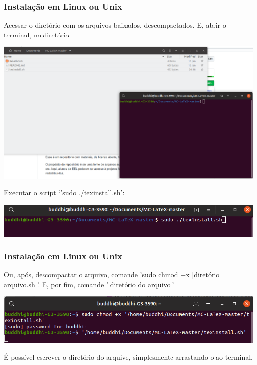 \documentclass{beamer}
\begin{document}
\begin{frame}
  \frametitle{Instalação em Linux ou Unix}

  \begin{tcolorbox}[width=12cm, height=10.1mm, top=0.1mm]
    Acessar o diretório com os arquivos baixados, descompactados. E,
    abrir o terminal, no diretório.
  \end{tcolorbox}

  \begin{center}
    \includegraphics[scale=0.15]{../Imagens/MC4.png}
  \end{center}

  \pause

  \begin{tcolorbox}[sharp corners, width=12cm, height=6.7mm, top=0.2mm]
    Executar o script `'sudo ./texinstall.sh':
  \end{tcolorbox}

  \begin{center}
    \includegraphics[scale=0.4]{../Imagens/MC5.png}
  \end{center}

\end{frame}


\begin{frame}
  \frametitle{Instalação em Linux ou Unix}
  \begin{tcolorbox}[sharp corners, shadow={2mm}{-1mm}{0mm}{black!50!white}]
    Ou, após, descompactar o arquivo, comande 'sudo chmod +x [diretório
    arquivo.sh]'. E, por fim, comande '[diretório do arquivo]'
  \end{tcolorbox}
  \begin{center}
    \includegraphics[scale=0.4]{../Imagens/MC6.png}
  \end{center}

  É possível escrever o diretório do arquivo, simplesmente
  arrastando-o ao terminal.

\end{frame}
\end{document}
